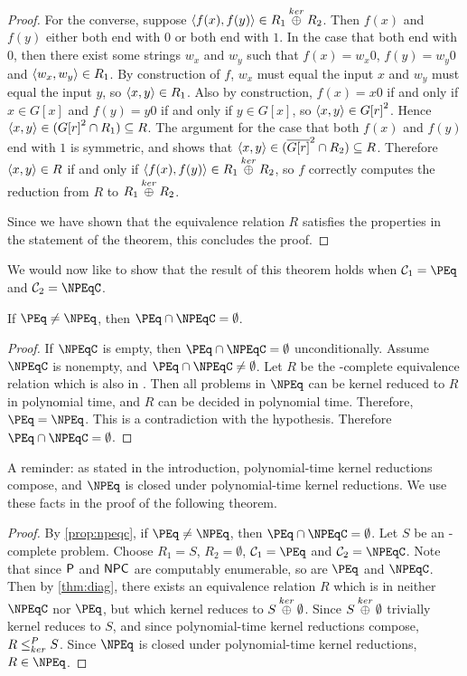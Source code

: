 \begin{proof}
  For the converse, suppose $\pair{f(x)}{f(y)}\in R_1\kj R_2$.
  Then $f(x)$ and $f(y)$ either both end with $0$ or both end with $1$.
  In the case that both end with $0$, then there exist some strings $w_x$ and $w_y$ such that $f(x)=w_x0$, $f(y)=w_y0$ and $\pair{w_x}{w_y}\in R_1$.
  By construction of $f$, $w_x$ must equal the input $x$ and $w_y$ must equal the input $y$, so $\pair{x}{y}\in R_1$.
  Also by construction, $f(x)=x0$ if and only if $x\in G[x]$ and $f(y)=y0$ if and only if $y\in G[x]$, so $\pair{x}{y}\in{G[r]}^2$.
  Hence $\pair{x}{y}\in({G[r]}^2\cap R_1)\subseteq R$.
  The argument for the case that both $f(x)$ and $f(y)$ end with $1$ is symmetric, and shows that $\pair{x}{y}\in(\overline{G[r]}^2\cap R_2)\subseteq R$.
  Therefore $\pair{x}{y}\in R$ if and only if $\pair{f(x)}{f(y)}\in R_1\kj R_2$, so $f$ correctly computes the reduction from $R$ to $R_1\kj R_2$.

  Since we have shown that the equivalence relation $R$ satisfies the properties in the statement of the theorem, this concludes the proof.
\end{proof}

We would now like to show that the result of this theorem holds when $\mathcal{C}_1=\PEq$ and $\mathcal{C}_2=\NPEqC$.

\begin{proposition}\label{prop:npeqc}
  If $\PEq \neq \NPEq$, then $\PEq \cap \NPEqC = \emptyset$.
\end{proposition}
\begin{proof}
  If $\NPEqC$ is empty, then $\PEq \cap \NPEqC = \emptyset$ unconditionally.
  Assume $\NPEqC$ is nonempty, and $\PEq \cap \NPEqC \neq \emptyset$.
  Let $R$ be the \NPEq-complete equivalence relation which is also in \PEq.
  Then all problems in $\NPEq$ can be kernel reduced to $R$ in polynomial time, and $R$ can be decided in polynomial time.
  Therefore, $\PEq=\NPEq$.
  This is a contradiction with the hypothesis.
  Therefore $\PEq\cap\NPEqC=\emptyset$.
\end{proof}

A reminder: as stated in the introduction, polynomial-time kernel reductions compose, and $\NPEq$ is closed under polynomial-time kernel reductions.
We use these facts in the proof of the following theorem.

\intermediary
\begin{proof}
  By \autoref{prop:npeqc}, if $\PEq \neq \NPEq$, then $\PEq \cap \NPEqC = \emptyset$.
  Let $S$ be an \NPEq-complete problem.
  Choose $R_1=S$, $R_2=\emptyset$, $\mathcal{C}_1=\PEq$ and $\mathcal{C}_2=\NPEqC$.
  Note that since $\P$ and $\NPC$ are computably enumerable, so are $\PEq$ and $\NPEqC$.
  Then by \autoref{thm:diag}, there exists an equivalence relation $R$ which is in neither $\NPEqC$ nor $\PEq$, but which kernel reduces to $S\kj\emptyset$.
  Since $S\kj\emptyset$ trivially kernel reduces to $S$, and since polynomial-time kernel reductions compose, $R\kr S$.
  Since $\NPEq$ is closed under polynomial-time kernel reductions, $R\in\NPEq$.
\end{proof}


